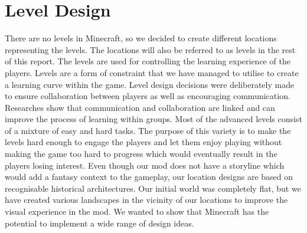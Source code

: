 \section{Level Design}
There are no levels in Minecraft, so we decided to create different locations representing the levels. The locations will also be referred to as levels in the rest of this report. The levels are used for controlling the learning experience of the players. Levels are a form of constraint that we have managed to utilise to create a learning curve within the game.
\newline\newline
Level design decisions were deliberately made to ensure collaboration between players as well as encouraging communication. Researches show that communication and collaboration are linked and can improve the process of learning within groups.
Most of the advanced levels consist of a mixture of easy and hard tasks. The purpose of this variety is to make the levels hard enough to engage the players and let them enjoy playing without making the game too hard to progress which would eventually result in the players losing interest.
\newline\newline
Even though our mod does not have a storyline which would add a fantasy context to the gameplay, our location designs are based on recognisable historical architectures. Our initial world was completely flat, but we have created various landscapes in the vicinity of our locations to improve the visual experience in the mod. We wanted to show that Minecraft has the potential to implement a wide range of design ideas.

